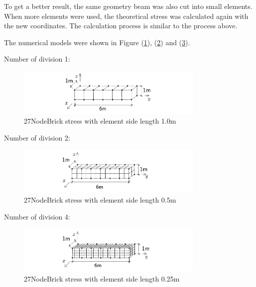 \documentclass[fleqn,11pt]{article}
\begin{document}
To get a better result, the same geometry beam was also cut into small elements. When more elements were used, the theoretical stress was calculated again with the new coordinates. The calculation process is similar to the process above. 


The numerical models were shown in Figure (\ref{fig 27NodeBrick stress with element side length 1.0m}), (\ref{fig 27NodeBrick stress with element side length 0.5m}) and (\ref{fig 27NodeBrick stress with element side length 0.25m}). 


Number of division 1:

\begin{figure}[H]
  \centering
  \includegraphics[width=9cm]{../Figure-files/beam_8brick.pdf}
  \caption{27NodeBrick stress with element side length 1.0m}
  \label{fig 27NodeBrick stress with element side length 1.0m}
\end{figure}

Number of division 2:

\begin{figure}[H]
  \centering
  \includegraphics[width=9cm]{../Figure-files/beam_8brick_more_2.pdf}
  \caption{27NodeBrick stress with element side length 0.5m}
  \label{fig 27NodeBrick stress with element side length 0.5m}
\end{figure}

Number of division 4:

\begin{figure}[H]
  \centering
  \includegraphics[width=9cm]{../Figure-files/beam_8brick_more.pdf}
  \caption{27NodeBrick stress with element side length 0.25m}
  \label{fig 27NodeBrick stress with element side length 0.25m}
\end{figure}
\end{document}
